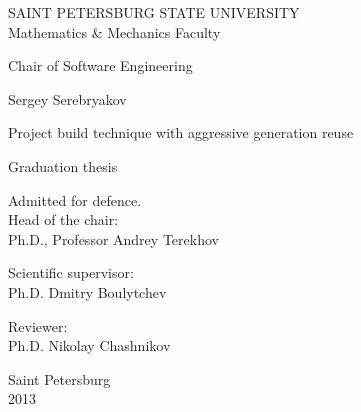 %
%
\thispagestyle{empty}
\begin{center}
SAINT PETERSBURG STATE UNIVERSITY\\
Mathematics \& Mechanics Faculty\\
\end{center}

\begin{center}
Chair of Software Engineering\\
\end{center}
\vspace{2cm}
\begin{center}
    \large{Sergey Serebryakov}
\end{center}
\begin{center}
    \LARGE{Project build technique with aggressive generation reuse} \\
\end{center}
\begin{center}
    \normalsize{Graduation thesis}
\end{center}
\vspace{1cm}
\noindent
\begin{flushright}
	\small
    Admitted for defence. \\
	Head of the chair: \\
	Ph.D., Professor Andrey Terekhov
\end{flushright}
\vspace{1cm}
\begin{flushright}
	\small
	Scientific supervisor: \\
	Ph.D. Dmitry Boulytchev
\end{flushright}
\vspace{1cm}
\begin{flushright}
	\small
	Reviewer: \\
	Ph.D. Nikolay Chashnikov
\end{flushright}
\vspace{\fill}
\begin{center}
    \small
    Saint Petersburg\\2013
\end{center}
